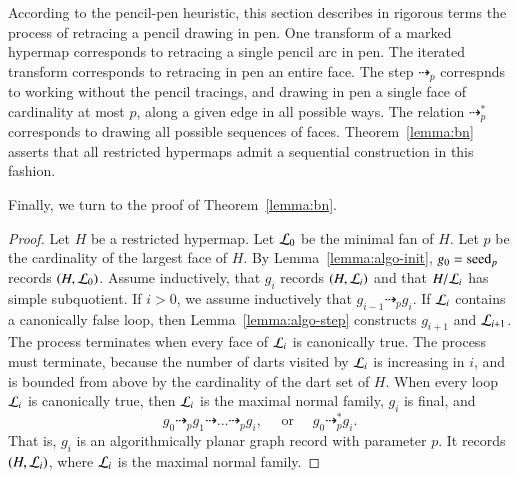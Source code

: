 \begin{remark}
  According to the pencil-pen heuristic, this section describes in
  rigorous terms the process of retracing a pencil drawing in pen.
  One transform of a marked hypermap corresponds to retracing a single pencil
  arc in pen.  The iterated transform corresponds to retracing in pen an
  entire face.  The step $\dashrightarrow_p$ correspnds to working
  without the pencil tracings, and drawing in pen a single face of
  cardinality at most $p$, along a given edge in all possible ways.
  The relation $\dashrightarrow_p^*$ corresponds to drawing all
  possible sequences of faces.  Theorem~\ref{lemma:bn} asserts that
  all restricted hypermaps admit a sequential construction in this
  fashion.
\end{remark}


Finally, we  turn to the proof of Theorem~\ref{lemma:bn}.

\begin{proof}
Let $H$ be a restricted hypermap.  Let ${\cal L}_0$ be the minimal fan of $H$.
Let $p$ be the cardinality of the largest face of $H$.
By Lemma~\ref{lemma:algo-init}, $g_0={\operatorname{seed}}_p$ records $(H,{\cal L}_0)$.
Assume inductively, that $g_i$ records $(H,{\cal L}_i)$ and that $H/{\cal L}_i$
has simple subquotient.  If $i>0$, we assume inductively
that $g_{i-1}\dashrightarrow_p g_i$.  If ${\cal L}_i$ contains a canonically false
loop, then  Lemma~\ref{lemma:algo-step} constructs $g_{i+1}$ and ${\cal L}_{i+1}$.
The process terminates when every face of ${\cal L}_i$ is canonically true.
The process must terminate, because the number of darts visited by ${\cal L}_i$
is increasing in $i$, and is 
 bounded from above by the cardinality of the dart set of $H$.
When every loop ${\cal L}_i$ is canonically true, then ${\cal L}_i$ is the maximal
normal family, $g_i$ is final, and
\[
g_0 \dashrightarrow_p g_1 \dashrightarrow\ldots \dashrightarrow_p g_i,
\quad \text{ or }\quad  g_0 \dashrightarrow_p^* g_i.
\]
That is, $g_i$ is an algorithmically planar graph record with parameter $p$.
It records $(H,{\cal L}_i)$, where ${\cal L}_i$ is the maximal normal family.
\end{proof}